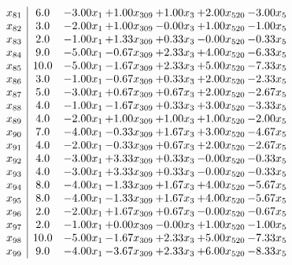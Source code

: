 \documentclass[8pt]{article}
\begin{document}
\[\begin{array}{c| c c@{\hskip 2pt} c@{\hskip 2pt} c@{\hskip 2pt} c@{\hskip 2pt} c@{\hskip 2pt} }
 x_{81}   &  6.0 & -3.00 x_{1} & +  1.00 x_{309} & +  1.00 x_{3} & +  2.00 x_{520} & -3.00 x_{5}\\
 x_{82}   &  3.0 & -2.00 x_{1} & +  1.00 x_{309} & -0.00 x_{3} & +  1.00 x_{520} & -1.00 x_{5}\\
 x_{83}   &  2.0 & -1.00 x_{1} & +  1.33 x_{309} & +  0.33 x_{3} & -0.00 x_{520} & -0.33 x_{5}\\
 x_{84}   &  9.0 & -5.00 x_{1} & -0.67 x_{309} & +  2.33 x_{3} & +  4.00 x_{520} & -6.33 x_{5}\\
 x_{85}   &  10.0 & -5.00 x_{1} & -1.67 x_{309} & +  2.33 x_{3} & +  5.00 x_{520} & -7.33 x_{5}\\
 x_{86}   &  3.0 & -1.00 x_{1} & -0.67 x_{309} & +  0.33 x_{3} & +  2.00 x_{520} & -2.33 x_{5}\\
 x_{87}   &  5.0 & -3.00 x_{1} & +  0.67 x_{309} & +  0.67 x_{3} & +  2.00 x_{520} & -2.67 x_{5}\\
 x_{88}   &  4.0 & -1.00 x_{1} & -1.67 x_{309} & +  0.33 x_{3} & +  3.00 x_{520} & -3.33 x_{5}\\
 x_{89}   &  4.0 & -2.00 x_{1} & +  1.00 x_{309} & +  1.00 x_{3} & +  1.00 x_{520} & -2.00 x_{5}\\
 x_{90}   &  7.0 & -4.00 x_{1} & -0.33 x_{309} & +  1.67 x_{3} & +  3.00 x_{520} & -4.67 x_{5}\\
 x_{91}   &  4.0 & -2.00 x_{1} & -0.33 x_{309} & +  0.67 x_{3} & +  2.00 x_{520} & -2.67 x_{5}\\
 x_{92}   &  4.0 & -3.00 x_{1} & +  3.33 x_{309} & +  0.33 x_{3} & -0.00 x_{520} & -0.33 x_{5}\\
 x_{93}   &  4.0 & -3.00 x_{1} & +  3.33 x_{309} & +  0.33 x_{3} & -0.00 x_{520} & -0.33 x_{5}\\
 x_{94}   &  8.0 & -4.00 x_{1} & -1.33 x_{309} & +  1.67 x_{3} & +  4.00 x_{520} & -5.67 x_{5}\\
 x_{95}   &  8.0 & -4.00 x_{1} & -1.33 x_{309} & +  1.67 x_{3} & +  4.00 x_{520} & -5.67 x_{5}\\
 x_{96}   &  2.0 & -2.00 x_{1} & +  1.67 x_{309} & +  0.67 x_{3} & -0.00 x_{520} & -0.67 x_{5}\\
 x_{97}   &  2.0 & -1.00 x_{1} & +  0.00 x_{309} & -0.00 x_{3} & +  1.00 x_{520} & -1.00 x_{5}\\
 x_{98}   &  10.0 & -5.00 x_{1} & -1.67 x_{309} & +  2.33 x_{3} & +  5.00 x_{520} & -7.33 x_{5}\\
 x_{99}   &  9.0 & -4.00 x_{1} & -3.67 x_{309} & +  2.33 x_{3} & +  6.00 x_{520} & -8.33 x_{5}\\

\end{array}\]
\end{document}
